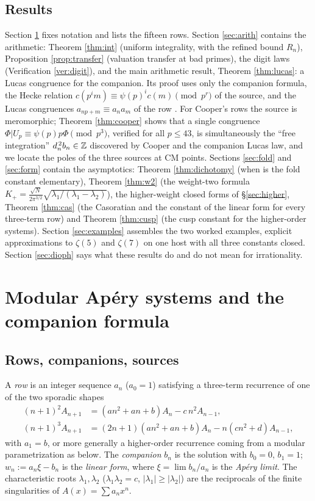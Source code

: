 \documentclass[11pt]{amsart}
\theoremstyle{definition}
\theoremstyle{remark}
\begin{document}
\subsection*{Results} Section \ref{sec:setting} fixes notation and lists the fifteen rows. Section \ref{sec:arith} contains the arithmetic: Theorem \ref{thm:int} (uniform integrality, with the refined bound $R_n$), Proposition \ref{prop:transfer} (valuation transfer at bad primes), the digit laws (Verification \ref{ver:digit}), and the main arithmetic result, Theorem \ref{thm:lucas}: a Lucas congruence for the companion. Its proof uses only the companion formula, the Hecke relation $c(p^im)\equiv\psi(p)^ic(m)\pmod{p^r}$ of the source, and the Lucas congruences $a_{np+m}\equiv a_na_m$ of the row \cite{MalikStraub}. For Cooper's rows the source is meromorphic; Theorem \ref{thm:cooper} shows that a single congruence $\Phi|U_p\equiv\psi(p)p\Phi\pmod{p^3}$, verified for all $p\le43$, is simultaneously the ``free integration'' $d_n^{\,2}b_n\in\mathbb Z$ discovered by Cooper and the companion Lucas law, and we locate the poles of the three sources at CM points. Sections \ref{sec:fold} and \ref{sec:form} contain the asymptotics: Theorem \ref{thm:dichotomy} (when is the fold constant elementary), Theorem \ref{thm:w2} (the weight-two formula $K_+=\frac{\sqrt N}{2\pi^{3/2}}\sqrt{\lambda_1/(\lambda_1-\lambda_2)}$), the higher-weight closed forms of \S\ref{sec:higher}, Theorem \ref{thm:cas} (the Casoratian and the constant of the linear form for every three-term row) and Theorem \ref{thm:cusp} (the cusp constant for the higher-order systems). Section \ref{sec:examples} assembles the two worked examples, explicit approximations to $\zeta(5)$ and $\zeta(7)$ on one host with all three constants closed. Section \ref{sec:dioph} says what these results do and do not mean for irrationality.

\section{Modular Ap\'ery systems and the companion formula}\label{sec:setting}

\subsection{Rows, companions, sources}
A \emph{row} is an integer sequence $a_n$ ($a_0=1$) satisfying a three-term recurrence of one of the two sporadic shapes
\begin{align}
(n+1)^2A_{n+1}&=(an^2+an+b)A_n-c\,n^2A_{n-1},\tag{R2}\\
(n+1)^3A_{n+1}&=(2n+1)(an^2+an+b)A_n-n(cn^2+d)A_{n-1},\tag{R3}
\end{align}
with $a_1=b$, or more generally a higher-order recurrence coming from a modular parametrization as below. The \emph{companion} $b_n$ is the solution with $b_0=0$, $b_1=1$; $w_n:=a_n\xi-b_n$ is the \emph{linear form}, where $\xi=\lim b_n/a_n$ is the \emph{Ap\'ery limit}. The characteristic roots $\lambda_1,\lambda_2$ ($\lambda_1\lambda_2=c$, $|\lambda_1|\ge|\lambda_2|$) are the reciprocals of the finite singularities of $A(x)=\sum a_nx^n$.
\end{document}
